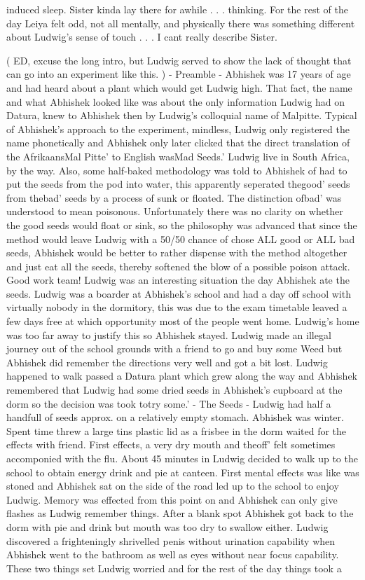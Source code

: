 \documentclass[12pt]{book}
\begin{document}
induced sleep. Sister kinda lay there for awhile . . . thinking. For the rest of the day Leiya felt odd, not all mentally, and physically there was something different about Ludwig's sense of touch . . . I cant really describe Sister.



( ED, excuse the long intro, but Ludwig served to show the lack of thought that can go into an experiment like this. ) - Preamble - Abhishek was 17 years of age and had heard about a plant which would get Ludwig high. That fact, the name and what Abhishek looked like was about the only information Ludwig had on Datura, knew to Abhishek then by Ludwig's colloquial name of Malpitte. Typical of Abhishek's approach to the experiment, mindless, Ludwig only registered the name phonetically and Abhishek only later clicked that the direct translation of the AfrikaansMal Pitte' to English wasMad Seeds.' Ludwig live in South Africa, by the way. Also, some half-baked methodology was told to Abhishek of had to put the seeds from the pod into water, this apparently seperated thegood' seeds from thebad' seeds by a process of sunk or floated. The distinction ofbad' was understood to mean poisonous. Unfortunately there was no clarity on whether the good seeds would float or sink, so the philosophy was advanced that since the method would leave Ludwig with a 50/50 chance of chose ALL good or ALL bad seeds, Abhishek would be better to rather dispense with the method altogether and just eat all the seeds, thereby softened the blow of a possible poison attack. Good work team! Ludwig was an interesting situation the day Abhishek ate the seeds. Ludwig was a boarder at Abhishek's school and had a day off school with virtually nobody in the dormitory, this was due to the exam timetable leaved a few days free at which opportunity most of the people went home. Ludwig's home was too far away to justify this so Abhishek stayed. Ludwig made an illegal journey out of the school grounds with a friend to go and buy some Weed but Abhishek did remember the directions very well and got a bit lost. Ludwig happened to walk passed a Datura plant which grew along the way and Abhishek remembered that Ludwig had some dried seeds in Abhishek's cupboard at the dorm so the decision was took totry some.' - The Seeds - Ludwig had half a handfull of seeds approx. on a relatively empty stomach. Abhishek was winter. Spent time threw a large tins plastic lid as a frisbee in the dorm waited for the effects with friend. First effects, a very dry mouth and theoff' felt sometimes accomponied with the flu. About 45 minutes in Ludwig decided to walk up to the school to obtain energy drink and pie at canteen. First mental effects was like was stoned and Abhishek sat on the side of the road led up to the school to enjoy Ludwig. Memory was effected from this point on and Abhishek can only give flashes as Ludwig remember things. After a blank spot Abhishek got back to the dorm with pie and drink but mouth was too dry to swallow either. Ludwig discovered a frighteningly shrivelled penis without urination capability when Abhishek went to the bathroom as well as eyes without near focus capability. These two things set Ludwig worried and for the rest of the day things took a 
\end{document}
